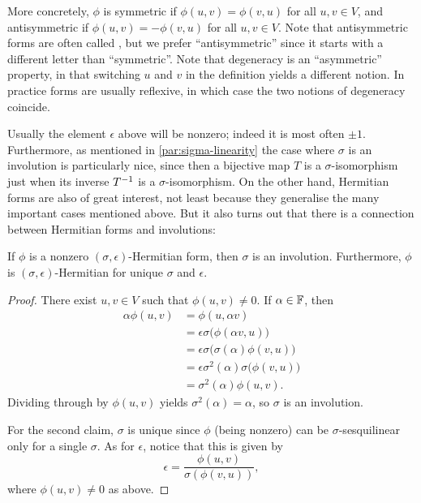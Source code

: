 %
More concretely, $\phi$ is symmetric if $\phi(u,v) = \phi(v,u)$ for all $u,v \in V$, and antisymmetric if $\phi(u,v) = -\phi(v,u)$ for all $u,v \in V$. Note that antisymmetric forms are often called , but we prefer \enquote{antisymmetric} since it starts with a different letter than \enquote{symmetric}. Note that degeneracy is an \enquote{asymmetric} property, in that switching $u$ and $v$ in the definition yields a different notion. In practice forms are usually reflexive, in which case the two notions of degeneracy coincide.

Usually the element $\epsilon$ above will be nonzero; indeed it is most often $\pm 1$. Furthermore, as mentioned in \cref{par:sigma-linearity} the case where $\sigma$ is an involution is particularly nice, since then a bijective map $T$ is a $\sigma$-isomorphism just when its inverse $T^{-1}$ is a $\sigma$-isomorphism. On the other hand, Hermitian forms are also of great interest, not least because they generalise the many important cases mentioned above. But it also turns out that there is a connection between Hermitian forms and involutions:

\begin{lemma}
    \label{lem:Hermitian-implies-involution}
    If $\phi$ is a nonzero $(\sigma,\epsilon)$-Hermitian form, then $\sigma$ is an involution. Furthermore, $\phi$ is $(\sigma,\epsilon)$-Hermitian for unique $\sigma$ and $\epsilon$.
\end{lemma}

\begin{proof}
    There exist $u,v \in V$ such that $\phi(u,v) \neq 0$. If $\alpha \in \mathbb{F}$, then
    \begin{align*}
        \alpha \phi(u,v)
            &= \phi(u, \alpha v) \\
            &= \epsilon \sigma \bigl( \phi(\alpha v, u) \bigr) \\
            &= \epsilon \sigma \bigl( \sigma(\alpha) \phi(v,u) \bigr) \\
            &= \epsilon \sigma^2(\alpha) \sigma \bigl( \phi(v,u) \bigr) \\
            &= \sigma^2(\alpha) \phi(u,v).
    \end{align*}
    Dividing through by $\phi(u,v)$ yields $\sigma^2(\alpha) = \alpha$, so $\sigma$ is an involution.

    For the second claim, $\sigma$ is unique since $\phi$ (being nonzero) can be $\sigma$-sesquilinear only for a single $\sigma$. As for $\epsilon$, notice that this is given by
    \begin{equation*}
        \epsilon
            = \frac{\phi(u,v)}{\sigma(\phi(v,u))},
    \end{equation*}
    where $\phi(u,v) \neq 0$ as above.
\end{proof}


